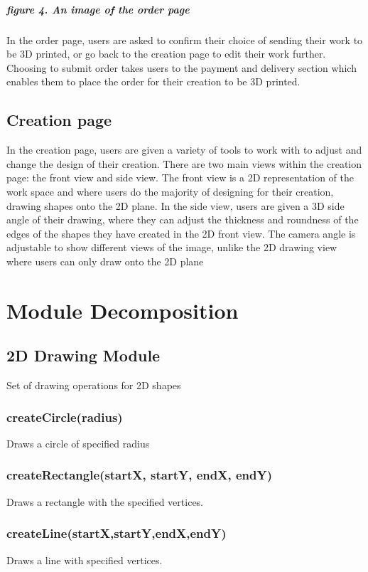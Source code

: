 \documentclass{report}
\begin{document}
\paragraph{figure 4. An image of the order page}
\paragraph{}In the order page, users are asked to confirm their choice of sending their work to be 3D printed, or go back to the creation page to edit their work further.  Choosing to submit order takes users to the payment and delivery section which enables them to place the order for their creation to be 3D printed. 
\section{Creation page}
In the creation page, users are given a variety of tools to work with to adjust and change the design of their creation.  There are two main views within the creation page: the front view and side view.  The front view is a 2D representation of the work space and where users do the majority of designing for their creation, drawing shapes onto the 2D plane.  In the side view, users are given a 3D side angle of their drawing, where they can adjust the thickness and roundness of the edges of the shapes they have created in the 2D front view.  The camera angle is adjustable to show different views of the image, unlike the 2D drawing view where users can only draw onto the 2D plane

\chapter{Module Decomposition}
\section{2D Drawing Module}
Set of drawing operations for 2D shapes
\subsection{createCircle(radius)}
Draws a circle of specified radius
\subsection{createRectangle(startX, startY, endX, endY)}
Draws a rectangle with the specified vertices.
\subsection{createLine(startX,startY,endX,endY)}
Draws a line with specified vertices.
\end{document}
